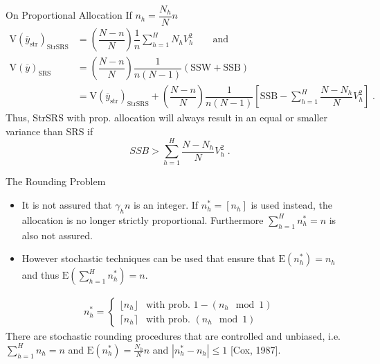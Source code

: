 \documentclass[10pt]{beamer}\usepackage[]{graphicx}\usepackage[]{color}
\newcommand{\E}[1]{\text{E}\left(#1\right)}
\newcommand{\V}[1]{\text{V}\left(#1\right)}
\begin{document}
\begin{frame}{On Proportional Allocation}
If $n_h =  \dfrac{N_h}{N}  n$  
\begin{align*}
\V{\overline{y}_{\text{str}}}_{\text{StrSRS}} & = \left( \dfrac{N - n}{N} \right) \dfrac{1}{n} \sum_{h=1}^H N_h  V_{h}^2\qquad \text{and }\\
\V{\overline{y}}_{\text{SRS}} & = \left( \dfrac{N - n}{N} \right) \dfrac{1}{n(N-1)} \left( \text{SSW} + \text{SSB} \right) \\
& = \V{\overline{y}_{\text{str}}}_{\text{StrSRS}} + \left(\dfrac{N - n}{N}  \right) \dfrac{1}{n(N-1)}\left[ \text{SSB} - \sum_{h=1}^H \dfrac{N - N_h}{N} V^2_{h}  \right]\;.
\end{align*}
Thus, StrSRS with prop. allocation will always result in an equal or smaller variance than SRS if
$$ SSB > \sum_{h=1}^H \dfrac{N - N_h}{N} V^2_{h} \;.$$
\end{frame}


\begin{frame}{The Rounding Problem}
  \begin{itemize}
  \item It is not assured that $\gamma_h n$ is an integer. If 
$n_h^{\ast}=\left[ n_h \right]$ is used instead, the allocation is no longer
strictly proportional. Furthermore $\sum_{h=1}^H n_h^{\ast}=n$ is also not assured.
  \item However stochastic techniques can be used that ensure that $\E{n_h^{\ast}}=n_h$ and
thus $\E{\sum_{h=1}^H n_h^{\ast}}=n$.
 \end{itemize}
  \begin{gather*}
  n_h^{\ast} = \begin{cases} \lfloor n_h \rfloor & \mbox{with prob. } 1 - (n_h \mod{1}) \\
			    \lceil  n_h \rceil  & \mbox{with prob. } (n_h \mod{1})
                \end{cases} 
 \end{gather*}
 There are stochastic rounding procedures that are controlled and unbiased, i.e. $\sum_{h=1}^H n_h =n$ and  $\E{n^{\ast}_h} = \frac{N_h}{N} n$ and $|n^{\ast}_{h} - n_{h}| \leq 1$ [Cox, 1987].
\end{frame}


\end{document}
